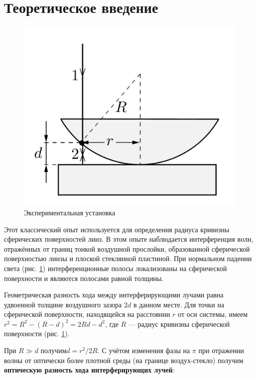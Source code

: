 \documentclass[a4paper,12pt]{article}
\begin{document}
\section*{Теоретическое введение}
	
	\begin{figure} 
		\includegraphics[width=\linewidth]{fig2}
		\caption{Экспериментальная установка}
		\label{ring}
	\end{figure}

	Этот классический опыт используется для определения радиуса кривизны сферических поверхностей линз. В этом опыте наблюдается интерференция волн, отражённых от границ тонкой воздушной прослойки, образованной сферической поверхностью линзы и плоской стеклянной пластиной. При нормальном падении света (рис. \ref{ring}) интерференционные полосы локализованы на сферической поверхности и являются полосами равной толщины.
	
	Геометрическая разность хода между интерферирующими лучами равна удвоенной толщине воздушного зазора $ 2d $ в данном месте. Для точки на сферической поверхности, находящейся на расстоянии $ r $ от оси системы, имеем $ r^2 = R^2 - (R - d)^2 = 2Rd - d^2 $, где $ R $ --- радиус кривизны сферической поверхности (рис. \ref{ring}).
	
	При $ R \gg d $ получим$  d = r^2/2R $. С учётом изменения фазы на $ \pi $ при отражении волны от оптически более плотной среды (на границе воздух-стекло) получим \textbf{оптическую разность хода интерферирующих лучей}:
	
\end{document}
